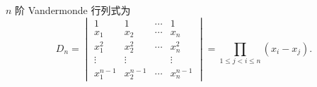 \begin{theorem}
    $n$ 阶 Vandermonde 行列式为
    $$D_n=
        \begin{vmatrix}
            1         & 1         & \cdots & 1         \\
            x_1       & x_2       & \cdots & x_n       \\
            x_1^2     & x_2^2     & \cdots & x_n^2     \\
            \vdots    & \vdots    &        & \vdots    \\
            x_1^{n-1} & x_2^{n-1} & \cdots & x_n^{n-1}
        \end{vmatrix}
        =\prod_{1\leqslant j<i\leqslant n}(x_i-x_j).$$
\end{theorem}

